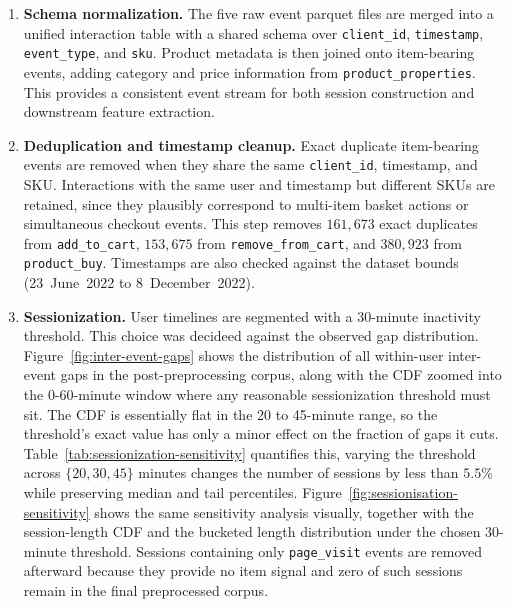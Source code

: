 \documentclass[sigconf,nonacm]{acmart}
\begin{document}
\begin{enumerate}
    \item \textbf{Schema normalization.}
    The five raw event parquet files are merged into a unified interaction table
    with a shared schema over \texttt{client\_id}, \texttt{timestamp},
    \texttt{event\_type}, and \texttt{sku}. Product metadata is then joined onto
    item-bearing events, adding category and price information from
    \texttt{product\_properties}. This provides a consistent event stream for both
    session construction and downstream feature extraction.

    \item \textbf{Deduplication and timestamp cleanup.}
    Exact duplicate item-bearing events are removed when they share the same
    \texttt{client\_id}, timestamp, and SKU. Interactions with the same user and
    timestamp but different SKUs are retained, since they plausibly correspond to
    multi-item basket actions or simultaneous checkout events. This step removes
    $161{,}673$ exact duplicates from \texttt{add\_to\_cart}, $153{,}675$ from
    \texttt{remove\_from\_cart}, and $380{,}923$ from \texttt{product\_buy}.
    Timestamps are also checked against the dataset bounds (23~June~2022 to
    8~December~2022).

    \item \textbf{Sessionization.}
    User timelines are segmented with a 30-minute inactivity threshold. This
    choice was decideed against the observed gap distribution. Figure~\ref{fig:inter-event-gaps} shows
    the distribution of all within-user inter-event gaps in the
    post-preprocessing corpus, along with the CDF zoomed into the 0-60-minute
    window where any reasonable sessionization threshold must sit. The CDF is
    essentially flat in the 20 to 45-minute range, so the threshold's exact value
    has only a minor effect on the fraction of gaps it cuts.
    Table~\ref{tab:sessionization-sensitivity} quantifies this, varying the
    threshold across $\{20, 30, 45\}$ minutes changes the number of sessions by
    less than $5.5\%$ while preserving median and tail percentiles.
    Figure~\ref{fig:sessionisation-sensitivity} shows the same sensitivity
    analysis visually, together with the session-length CDF and the bucketed
    length distribution under the chosen 30-minute threshold. Sessions containing
    only \texttt{page\_visit} events are removed afterward because they provide
    no item signal and zero of such sessions remain in the final preprocessed corpus.


\end{enumerate}
\end{document}
